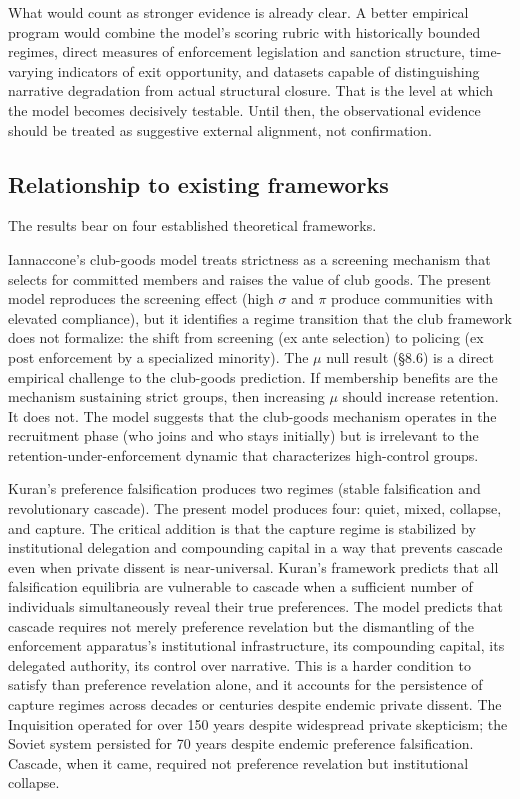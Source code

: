 \documentclass[12pt]{article}
\begin{document}
What would count as stronger evidence is already clear. A better empirical program would combine the model's scoring rubric with historically bounded regimes, direct measures of enforcement legislation and sanction structure, time-varying indicators of exit opportunity, and datasets capable of distinguishing narrative degradation from actual structural closure. That is the level at which the model becomes decisively testable. Until then, the observational evidence should be treated as suggestive external alignment, not confirmation.

\subsection{Relationship to existing frameworks}

The results bear on four established theoretical frameworks.

Iannaccone's club-goods model treats strictness as a screening mechanism that selects for committed members and raises the value of club goods. The present model reproduces the screening effect (high $\sigma$ and $\pi$ produce communities with elevated compliance), but it identifies a regime transition that the club framework does not formalize: the shift from screening (ex ante selection) to policing (ex post enforcement by a specialized minority). The $\mu$ null result (\S8.6) is a direct empirical challenge to the club-goods prediction. If membership benefits are the mechanism sustaining strict groups, then increasing $\mu$ should increase retention. It does not. The model suggests that the club-goods mechanism operates in the recruitment phase (who joins and who stays initially) but is irrelevant to the retention-under-enforcement dynamic that characterizes high-control groups.

Kuran's preference falsification produces two regimes (stable falsification and revolutionary cascade). The present model produces four: quiet, mixed, collapse, and capture. The critical addition is that the capture regime is stabilized by institutional delegation and compounding capital in a way that prevents cascade even when private dissent is near-universal. Kuran's framework predicts that all falsification equilibria are vulnerable to cascade when a sufficient number of individuals simultaneously reveal their true preferences. The model predicts that cascade requires not merely preference revelation but the dismantling of the enforcement apparatus's institutional infrastructure, its compounding capital, its delegated authority, its control over narrative. This is a harder condition to satisfy than preference revelation alone, and it accounts for the persistence of capture regimes across decades or centuries despite endemic private dissent. The Inquisition operated for over 150 years despite widespread private skepticism; the Soviet system persisted for 70 years despite endemic preference falsification. Cascade, when it came, required not preference revelation but institutional collapse.
\end{document}
